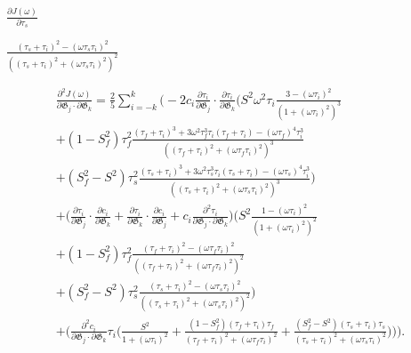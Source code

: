\documentclass[a4paper,11pt,twoside,openright]{book}
\def\lthtmlcheckvsize{\ifdim\ht\sizebox<\vsize 
  \ifdim\wd\sizebox<\hsize\expandafter\hfill\fi \expandafter\vfill
  \else\expandafter\vss\fi}%
\begin{document}
{\newpage\clearpage
{}%
$\displaystyle {\frac{{\partial J(\omega)}}{{\partial \tau_s}}}$%
\lthtmlindisplaymathZ
\lthtmlcheckvsize\clearpage}

{\newpage\clearpage
{}%
$\displaystyle {\frac{{(\tau_s + \tau_i)^2 - (\omega \tau_s \tau_i)^2}}{{\left((\tau_s + \tau_i)^2 + (\omega \tau_s \tau_i)^2 \right)^2}}}$%
\lthtmlindisplaymathZ
\lthtmlcheckvsize\clearpage}

{\newpage\clearpage
{}%
\begin{multline}
    \frac{\partial^2 J(\omega)}{\partial \mathfrak{G}_j \cdot \partial \mathfrak{G}_k} = \frac{2}{5} \sum_{i=-k}^k \Bigg(
        -2 c_i \frac{\partial \tau_i}{\partial \mathfrak{G}_j} \cdot \frac{\partial \tau_i}{\partial \mathfrak{G}_k} \Bigg(
            S^2 \omega^2 \tau_i \frac{3 - (\omega \tau_i)^2}{\left(1 + (\omega \tau_i)^2 \right)^3}  \\
            + (1 - S^2_f) \tau_f^2 \frac{(\tau_f + \tau_i)^3  +  3 \omega^2 \tau_f^3 \tau_i (\tau_f + \tau_i)  -  (\omega \tau_f)^4 \tau_i^3}
                {\left((\tau_f + \tau_i)^2 + (\omega \tau_f \tau_i)^2 \right)^3} \\
            + (S^2_f - S^2) \tau_s^2 \frac{(\tau_s + \tau_i)^3  +  3 \omega^2 \tau_s^3 \tau_i (\tau_s + \tau_i)  -  (\omega \tau_s)^4 \tau_i^3}
                {\left((\tau_s + \tau_i)^2 + (\omega \tau_s \tau_i)^2 \right)^3}
        \Bigg) \\
        + \Bigg(
            \frac{\partial \tau_i}{\partial \mathfrak{G}_j} \cdot \frac{\partial c_i}{\partial \mathfrak{G}_k}
            + \frac{\partial \tau_i}{\partial \mathfrak{G}_k} \cdot \frac{\partial c_i}{\partial \mathfrak{G}_j}
            + c_i \frac{\partial^2 \tau_i}{\partial \mathfrak{G}_j \cdot \partial \mathfrak{G}_k}
        \Bigg)
        \Bigg(
            S^2 \frac{1 - (\omega \tau_i)^2}{\left(1 + (\omega \tau_i)^2 \right)^2} \\
            + (1 - S^2_f) \tau_f^2 \frac{(\tau_f + \tau_i)^2 - (\omega \tau_f \tau_i)^2}{\left((\tau_f + \tau_i)^2 + (\omega \tau_f \tau_i)^2 \right)^2} \\
            + (S^2_f - S^2) \tau_s^2 \frac{(\tau_s + \tau_i)^2 - (\omega \tau_s \tau_i)^2}{\left((\tau_s + \tau_i)^2 + (\omega \tau_s \tau_i)^2 \right)^2}
        \Bigg) \\
        + \Bigg(
            \frac{\partial^2 c_i}{\partial \mathfrak{G}_j \cdot \partial \mathfrak{G}_k} \tau_i \Bigg(
                \frac{S^2}{1 + (\omega \tau_i)^2}
                + \frac{(1 - S^2_f)(\tau_f + \tau_i)\tau_f}{(\tau_f + \tau_i)^2 + (\omega \tau_f \tau_i)^2}
                + \frac{(S^2_f - S^2)(\tau_s + \tau_i)\tau_s}{(\tau_s + \tau_i)^2 + (\omega \tau_s \tau_i)^2}
            \Bigg)
        \Bigg)
    \Bigg).
\end{multline}%
\lthtmldisplayZ
\lthtmlcheckvsize\clearpage}
\end{document}
